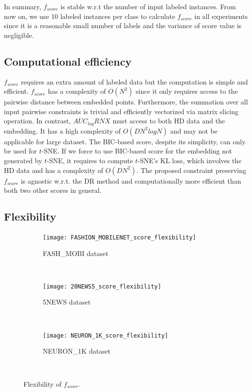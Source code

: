 In summary, $f_{score}$ is stable w.r.t the number of input labeled instances.
From now on, we use 10 labeled instances per class to calculate $f_{score}$ in all experiments since it is a reasonable small number of labels and the variance of score value is negligible.


\subsection{Computational efficiency}\label{sec:efficiency}
$f_{score}$ requires an extra amount of labeled data but the computation is simple and efficient.
$f_{score}$ has a complexity of $O(N^2)$ since it only requires access to the pairwise distance between embedded points.
Furthermore, the summation over all input pairwise constraints is trivial and efficiently vectorized via matrix slicing operation.
In contrast, $AUC_{log}RNX$ must access to both HD data and the embedding.
It has a high complexity of $O(DN^2logN)$ and may not be applicable for large dataset.
The BIC-based score, despite its simplicity, can only be used for $t$-SNE.
If we force to use BIC-based score for the embedding not generated by $t$-SNE, it requires to compute $t$-SNE's KL loss, which involves the HD data and has a complexity of $O(DN^2)$.
The proposed constraint preserving $f_{score}$ is agnostic w.r.t. the DR method and computationally more efficient than both two other scores in general.


\subsection{Flexibility}\label{sec:flexibility}

\begin{figure}[ht!]
    \centering
    \begin{subfigure}[b]{.32\linewidth}
        \texttt{[image: FASHION\_MOBILENET\_score\_flexibility]}
        \caption{{FASH\_MOBI} dataset}
        \label{fig:flexibility:FASHMOBI}
    \end{subfigure}
    ~
    \begin{subfigure}[b]{.32\linewidth}
        \texttt{[image: 20NEWS5\_score\_flexibility]}
        \caption{5NEWS dataset}
        \label{fig:flexibility:5NEWS}
    \end{subfigure}
    ~
    \begin{subfigure}[b]{.32\linewidth}
        \texttt{[image: NEURON\_1K\_score\_flexibility]}
        \caption{{NEURON\_1K} dataset}
        \label{fig:flexibility:NEURON1K}
    \end{subfigure}
    ~
    \caption{Flexibility of $f_{score}$.}
    \label{fig:flexibility}
\end{figure}

